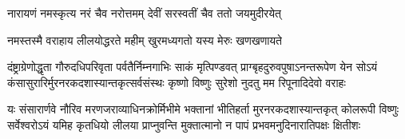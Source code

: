 
\twolineshloka
{नारायणं नमस्कृत्य नरं चैव नरोत्तमम्}
{देवीं सरस्वतीं चैव ततो जयमुदीरयेत्}

\twolineshloka
{नमस्तस्मै वराहाय लीलयोद्धरते महीम्}
{खुरमध्यगतो यस्य मेरुः खणखणायते}

\fourlineindentedshloka
{दंष्ट्राग्रेणोद्धृता गौरुदधिपरिवृता पर्वतैर्निम्नगाभिः}
{साकं मृत्पिण्डवत् प्राग्बृहदुरुवपुषाऽनन्तरूपेण येन}
{सोऽयं कंसासुरारिर्मुरनरकदशास्यान्तकृत्सर्वसंस्थः}
{कृष्णो विष्णुः सुरेशो नुदतु मम रिपूनादिदेवो वराहः}

\fourlineindentedshloka
{यः संसारार्णवे नौरिव मरणजराव्याधिनक्रोर्मिभीमे}
{भक्तानां भीतिहर्ता मुरनरकदशास्यान्तकृत् कोलरूपी}
{विष्णुः सर्वेश्वरोऽयं यमिह कृतधियो लीलया प्राप्नुवन्ति}
{मुक्तात्मानो न पापं प्रभवमनुदिनारातिपक्षः क्षितीशः}
